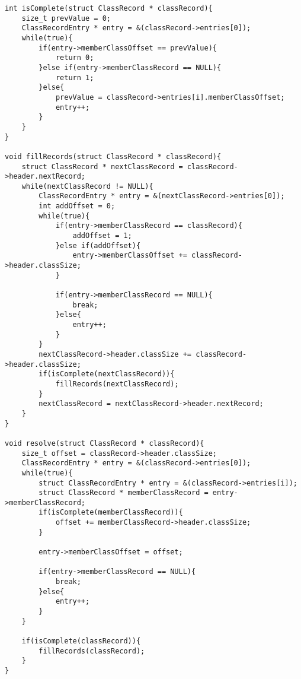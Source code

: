 \documentclass{article}
\begin{document}
\begin{verbatim}
int isComplete(struct ClassRecord * classRecord){
    size_t prevValue = 0;
    ClassRecordEntry * entry = &(classRecord->entries[0]);
    while(true){
    	if(entry->memberClassOffset == prevValue){
            return 0;
        }else if(entry->memberClassRecord == NULL){
            return 1;
        }else{
            prevValue = classRecord->entries[i].memberClassOffset;
            entry++;
        }
    }
}

void fillRecords(struct ClassRecord * classRecord){
    struct ClassRecord * nextClassRecord = classRecord->header.nextRecord;
    while(nextClassRecord != NULL){
        ClassRecordEntry * entry = &(nextClassRecord->entries[0]);
        int addOffset = 0;
        while(true){
            if(entry->memberClassRecord == classRecord){
                addOffset = 1;
            }else if(addOffset){
                entry->memberClassOffset += classRecord->header.classSize;
            }
            
            if(entry->memberClassRecord == NULL){
                break;
            }else{
                entry++;
            }
        }
        nextClassRecord->header.classSize += classRecord->header.classSize;
        if(isComplete(nextClassRecord)){
            fillRecords(nextClassRecord);
        }
        nextClassRecord = nextClassRecord->header.nextRecord;
    }
}

void resolve(struct ClassRecord * classRecord){
    size_t offset = classRecord->header.classSize;
    ClassRecordEntry * entry = &(classRecord->entries[0]);
    while(true){
    	struct ClassRecordEntry * entry = &(classRecord->entries[i]);
        struct ClassRecord * memberClassRecord = entry->memberClassRecord;
        if(isComplete(memberClassRecord)){
            offset += memberClassRecord->header.classSize;
        }
        
        entry->memberClassOffset = offset;
        
        if(entry->memberClassRecord == NULL){
            break;
        }else{
            entry++;
        }
    }
    
    if(isComplete(classRecord)){
        fillRecords(classRecord);
    }
}
\end{verbatim}
\end{document}
